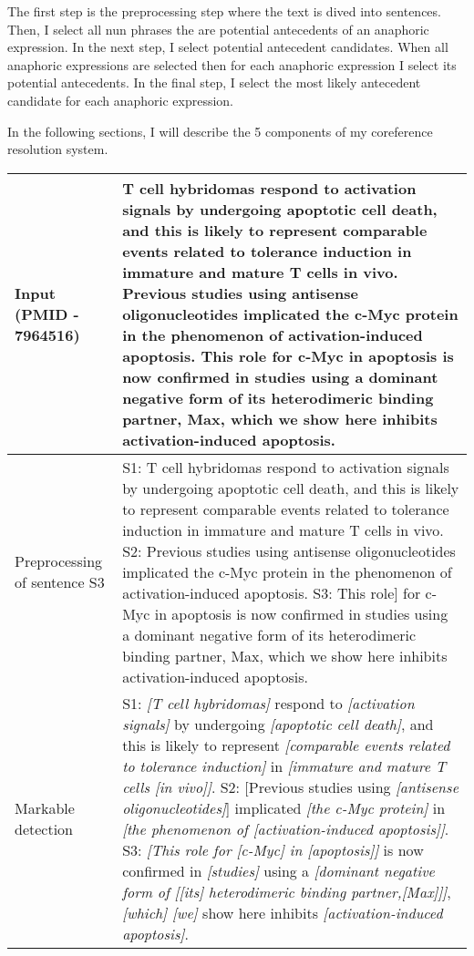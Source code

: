 The first step is the preprocessing step where the text is dived into sentences. Then, I select all nun phrases the are potential antecedents of an anaphoric expression. In the next step, I select potential antecedent candidates. When  all anaphoric expressions  are selected then for each anaphoric expression I select its potential antecedents. In the final step, I select the most likely antecedent candidate for each anaphoric expression.   
   
In the following sections, I will describe the 5 components of my coreference resolution system. 
  
\begin{table}
   \begin{tabular}{ m{20mm} m{113mm} } 
	\footnotesize{Input (PMID - 7964516)}&\footnotesize{T cell hybridomas respond to activation signals by undergoing apoptotic cell death, and this is likely to represent comparable events related to tolerance induction in immature and mature T cells in vivo. Previous studies using antisense oligonucleotides implicated the c-Myc protein in the phenomenon of activation-induced apoptosis. This role for c-Myc in apoptosis is now confirmed in studies using a dominant negative form of its heterodimeric binding partner, Max, which we show here inhibits activation-induced apoptosis.}\\
	\hline
	\footnotesize{Preprocessing of sentence S3}&\footnotesize{S1: T cell hybridomas respond to activation signals by undergoing apoptotic cell death, and this is likely to represent comparable events related to tolerance induction in immature and mature T cells in vivo. S2: Previous studies using antisense oligonucleotides implicated the c-Myc protein in the phenomenon of activation-induced apoptosis. S3: This role] for c-Myc in apoptosis is now confirmed in studies using a dominant negative form of its heterodimeric binding partner, Max, which we show here inhibits activation-induced apoptosis.}\\
	\hline
	\footnotesize{Markable detection} &\footnotesize{S1: \textit{[T cell hybridomas]} respond to \textit{[activation signals]} by undergoing \textit{[apoptotic cell death]}, and this is likely to represent\textit{ [comparable events related to tolerance induction]} in \textit{[immature and mature T cells [in vivo]]}. S2: [Previous studies using\textit{ [antisense oligonucleotides]}] implicated\textit{ [the c-Myc protein]} in \textit{[the phenomenon of [activation-induced apoptosis]]}. S3: \textit{[This role for [c-Myc] in [apoptosis]]} is now confirmed in \textit{[studies]} using a \textit{[dominant negative form of [[its] heterodimeric binding partner,[Max]]]}, \textit{[which] [we]} show here inhibits \textit{[activation-induced apoptosis]}.}\\

\end{tabular}
\end{table}
